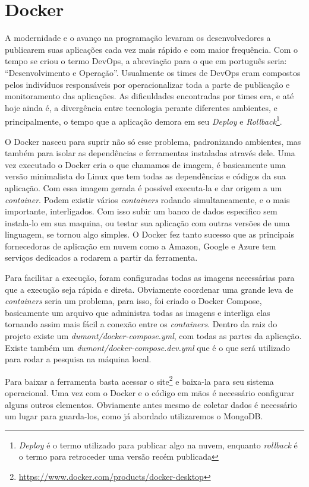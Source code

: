 \chapter{Docker}
\label{app:docker}

A modernidade e o avanço na programação levaram os desenvolvedores a publicarem suas aplicações cada vez mais rápido e com maior frequência. Com o tempo se criou o termo DevOps, a abreviação para o que em português seria: “Desenvolvimento e Operação”. Usualmente os times de DevOps eram compostos pelos indivíduos responsáveis por operacionalizar toda a parte de publicação e monitoramento das aplicações. As dificuldades encontradas por times era, e até hoje ainda é, a divergência entre tecnologia perante diferentes ambientes, e principalmente, o tempo que a aplicação demora em seu \textit{Deploy} e \textit{Rollback}\footnote{\textit{Deploy} é o termo utilizado para publicar algo na nuvem, enquanto \textit{rollback} é o termo para retroceder uma versão recém publicada}.

O Docker nasceu para suprir não só esse problema, padronizando ambientes, mas também para isolar as dependências e ferramentas instaladas através dele. Uma vez executado o Docker cria o que chamamos de imagem, é basicamente uma versão minimalista do Linux que tem todas as dependências e códigos da sua aplicação. Com essa imagem gerada é possível executa-la e dar origem a um \textit{container}. Podem existir vários \textit{containers} rodando simultaneamente, e o mais importante, interligados. Com isso subir um banco de dados especifico sem instala-lo em sua maquina, ou testar sua aplicação com outras versões de uma linguagem, se tornou algo simples. O Docker fez tanto sucesso que as principais fornecedoras de aplicação em nuvem como a Amazon, Google e Azure tem serviços dedicados a rodarem a partir da ferramenta.

Para facilitar a execução, foram configuradas todas as imagens necessárias para que a execução seja rápida e direta. Obviamente coordenar uma grande leva de \textit{containers} seria um problema, para isso, foi criado o Docker Compose, basicamente um arquivo que administra todas as imagens e interliga elas tornando assim mais fácil a conexão entre os \textit{containers}. Dentro da raiz do projeto existe um \textit{dumont/docker-compose.yml}, com todas as partes da aplicação. Existe também um \textit{dumont/docker-compose.dev.yml} que é o que será utilizado para rodar a pesquisa na máquina local.

Para baixar a ferramenta basta acessar o site\footnote{\url{https://www.docker.com/products/docker-desktop}} e baixa-la para seu sistema operacional. Uma vez com o Docker e o código em mãos é necessário configurar alguns outros elementos. Obviamente antes mesmo de coletar dados é necessário um lugar para guarda-los, como já abordado utilizaremos o MongoDB.

